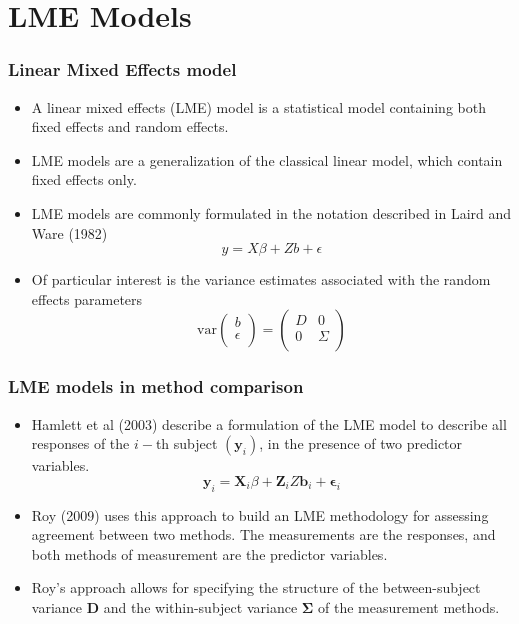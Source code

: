 \section{LME Models}
\begin{frame}\frametitle{Linear Mixed Effects model}

\begin{itemize}
\item A linear mixed effects (LME) model is a statistical model containing both fixed effects and random effects.
\item LME models are a generalization of the classical linear model, which contain fixed effects only.
\item
LME models are commonly formulated in the notation described in Laird and Ware (1982)
\[
y = X\beta + Zb + \epsilon
\label{LW}
\]
\item Of particular interest is the variance estimates associated with the random effects parameters\[
\mathrm{var}
\left(
              \begin{array}{c}
                b \\
                \epsilon \\
              \end{array}
            \right)
   =
\left(
         \begin{array}{cc}
           D & 0 \\
           0 & \Sigma \\
         \end{array}
       \right)
\]
\end{itemize}

\end{frame}
\begin{frame}\frametitle{LME models in method comparison }
\begin{itemize}
\item Hamlett et al (2003) describe a formulation of the LME model to describe all responses of the $i-$th subject $(\boldsymbol{y}_{i})$, in the presence of two predictor variables.
\[
\boldsymbol{y}_{i} = \boldsymbol{X}_{i}\beta + \boldsymbol{Z}_{i}Z\boldsymbol{b}_{i} + \boldsymbol{\epsilon}_{i}
\]

\item Roy (2009) uses this approach to build an LME methodology for assessing agreement between two methods. The measurements are the responses, and both methods of measurement are the predictor variables. 
\item Roy's approach allows for specifying the structure of the between-subject variance $\boldsymbol{D}$ and the within-subject variance $\boldsymbol{\Sigma}$ of the measurement methods.
\end{itemize}
\end{frame}
